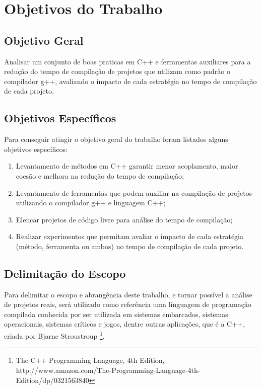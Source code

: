 \section*{Objetivos do Trabalho}

\subsection*{Objetivo Geral}

Analisar um conjunto de boas praticas em C++ e ferramentas auxiliares
 para a redução do tempo de compilação de projetos que utilizam como
 padrão o compilador g++, avaliando o impacto de cada estratégia no
 tempo de compilação de cada projeto.

\subsection*{Objetivos Específicos}

Para conseguir atingir o objetivo geral do trabalho foram listados
 alguns objetivos específicos:


\begin{enumerate}
    \item Levantamento de  métodos em C++ garantir menor acoplamento,
 maior coesão e melhora na redução do tempo de compilação;
    \item Levantamento de ferramentas que podem auxiliar na compilação
 de projetos utilizando o compilador g++ e linguagem C++;
    \item Elencar projetos de código livre para análise do tempo de
 compilação;
    \item Realizar experimentos que permitam avaliar o impacto de cada
 estratégia (método, ferramenta ou ambos) no tempo de compilação de
 cada projeto.
\end{enumerate}

\subsection*{Delimitação do Escopo}

Para delimitar o escopo e abrangência deste trabalho, e tornar possível
 a análise de projetos reais, será utilizado como referência uma linguagem
 de programação compilada conhecida por ser utilizada em sistemas embarcados,
 sistemas operacionais, sistemas críticos e jogos, dentre outras aplicações,
 que é a C++, criada por Bjarne Stroustroup \footnote{The C++ Programming
 Language, 4th Edition, http://www.amazon.com/The-Programming-Language-4th-Edition/dp/0321563840}.

